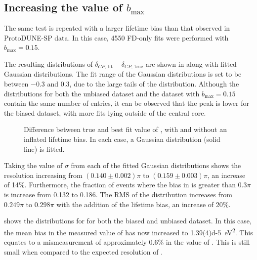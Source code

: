 \subsection{Increasing the value of $b_{\text{max}}$}

The same test is repeated with a larger lifetime bias than that observed in ProtoDUNE-SP data. 
In this case, \num{4550} FD-only fits were performed with $b_{\text{max}} = 0.15$.

The resulting distributions of $\delta_{CP,~\text{fit}} - \delta_{CP,~\text{true}}$ are shown in  along with fitted Gaussian distributions.
The fit range of the Gaussian distributions is set to be between \num{-0.3} and \num{0.3}, due to the large tails of the distribution.
Although the distributions for both the unbiased dataset and the dataset with $b_{\text{max}} = 0.15$ contain the same number of entries, it can be observed that the peak is lower for the biased dataset, with more fits lying outside of the central core.

\begin{figure}[h]
	\begin{adjustbox}{max totalsize=.6\textwidth, center}
		
	\end{adjustbox}
	\caption[Difference between true and best fit value of \dcp, with and without an inflated lifetime bias.]{Difference between true and best fit value of \dcp, with and without an inflated lifetime bias. In each case, a Gaussian distribution (solid line) is fitted.}
	\label{fig:paramComp15pc:delta}
\end{figure}

Taking the value of $\sigma$ from each of the fitted Gaussian distributions shows the \dcp resolution increasing from $(0.140 \pm 0.002)\pi$ to $(0.159 \pm 0.003)\pi$, an increase of 14\%.
Furthermore, the fraction of events where the bias in \dcp is greater than $0.3\pi$ is increase from 0.132 to 0.186.
The RMS of the distribution increases from $0.249\pi$ to $0.298\pi$ with the addition of the lifetime bias, an increase of 20\%. 

 shows the distributions for  for both the biased and unbiased dataset.
In this case, the mean bias in the measured value of  has now increased to \SI{1.39(4)d-5}{\eV\squared}.
This equates to a mismeasurement of approximately 0.6\% in the value of .
This is still small when compared to the expected resolution of .  

